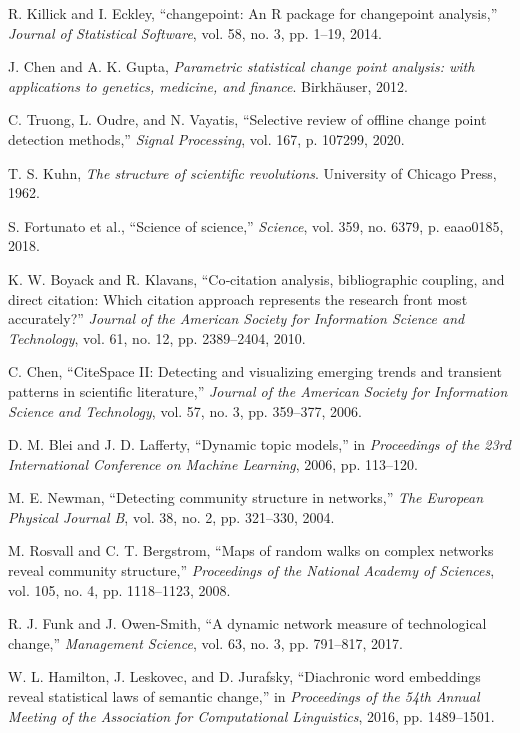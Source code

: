 \documentclass[conference]{IEEEtran}
\begin{document}
\begin{thebibliography}{10}

R. Killick and I. Eckley, ``changepoint: An R package for changepoint analysis,'' \emph{Journal of Statistical Software}, vol. 58, no. 3, pp. 1--19, 2014.

J. Chen and A. K. Gupta, \emph{Parametric statistical change point analysis: with applications to genetics, medicine, and finance}. Birkhäuser, 2012.

C. Truong, L. Oudre, and N. Vayatis, ``Selective review of offline change point detection methods,'' \emph{Signal Processing}, vol. 167, p. 107299, 2020.

T. S. Kuhn, \emph{The structure of scientific revolutions}. University of Chicago Press, 1962.

S. Fortunato et al., ``Science of science,'' \emph{Science}, vol. 359, no. 6379, p. eaao0185, 2018.

K. W. Boyack and R. Klavans, ``Co‐citation analysis, bibliographic coupling, and direct citation: Which citation approach represents the research front most accurately?'' \emph{Journal of the American Society for Information Science and Technology}, vol. 61, no. 12, pp. 2389--2404, 2010.

C. Chen, ``CiteSpace II: Detecting and visualizing emerging trends and transient patterns in scientific literature,'' \emph{Journal of the American Society for Information Science and Technology}, vol. 57, no. 3, pp. 359--377, 2006.

D. M. Blei and J. D. Lafferty, ``Dynamic topic models,'' in \emph{Proceedings of the 23rd International Conference on Machine Learning}, 2006, pp. 113--120.

M. E. Newman, ``Detecting community structure in networks,'' \emph{The European Physical Journal B}, vol. 38, no. 2, pp. 321--330, 2004.

M. Rosvall and C. T. Bergstrom, ``Maps of random walks on complex networks reveal community structure,'' \emph{Proceedings of the National Academy of Sciences}, vol. 105, no. 4, pp. 1118--1123, 2008.

R. J. Funk and J. Owen-Smith, ``A dynamic network measure of technological change,'' \emph{Management Science}, vol. 63, no. 3, pp. 791--817, 2017.

W. L. Hamilton, J. Leskovec, and D. Jurafsky, ``Diachronic word embeddings reveal statistical laws of semantic change,'' in \emph{Proceedings of the 54th Annual Meeting of the Association for Computational Linguistics}, 2016, pp. 1489--1501.

\end{thebibliography}
\end{document}
